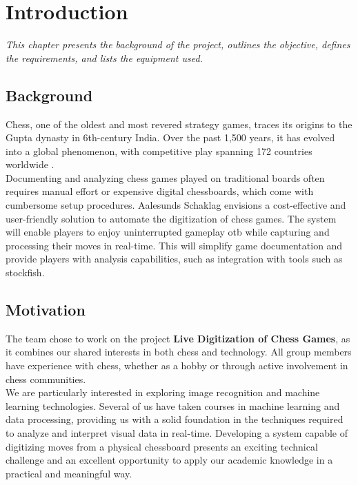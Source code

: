 \chapter{Introduction}

\begin{center} 
\textit{This chapter presents the background of the project, outlines the objective, defines the requirements, and lists the equipment used.}
\end{center}


\section{Background}

Chess, one of the oldest and most revered strategy games, traces its origins to the Gupta dynasty in 6th-century India. Over the past 1,500 years, it has evolved into a global phenomenon, with competitive play spanning 172 countries worldwide \cite{artsnculture}. \\

Documenting and analyzing chess games played on traditional boards often requires manual effort or expensive digital chessboards, which come with cumbersome setup procedures. Aalesunds Schaklag envisions a cost-effective and user-friendly solution to automate the digitization of chess games.  The system will enable players to enjoy uninterrupted gameplay \gls{otb} while capturing and processing their moves in real-time. This will simplify game documentation and provide players with analysis capabilities, such as integration with tools such as \gls{stockfish}.

\section{Motivation}

The team chose to work on the project \textbf{Live Digitization of Chess Games}, as it combines our shared interests in both chess and technology. All group members have experience with chess, whether as a hobby or through active involvement in chess communities. \\

We are particularly interested in exploring image recognition and machine learning technologies. Several of us have taken courses in machine learning and data processing, providing us with a solid foundation in the techniques required to analyze and interpret visual data in real-time. Developing a system capable of digitizing moves from a physical chessboard presents an exciting technical challenge and an excellent opportunity to apply our academic knowledge in a practical and meaningful way.


